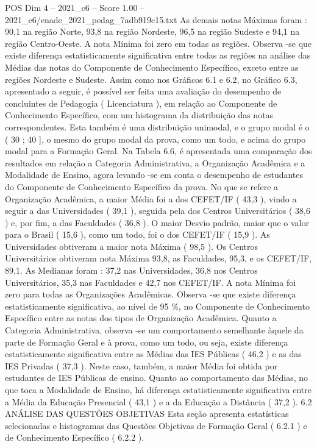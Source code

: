 \begin{textsample}{POS Dim 4 – 2021\_c6 – Score 1.00 – 2021\_c6/enade\_2021\_pedag\_7adb919c15.txt}
As demais notas Máximas foram : 90,1 na região Norte, 93,8 na região Nordeste, 96,5 na região Sudeste e 94,1 na região Centro-Oeste.
A nota Mínima foi zero em todas as regiões.
Observa -se que existe diferença estatisticamente significativa entre todas as regiões na análise das Médias das notas do Componente de Conhecimento Específico, exceto entre as regiões Nordeste e Sudeste.
Assim como nos Gráficos 6.1 e 6.2, no Gráfico 6.3, apresentado a seguir, é possível ser feita uma avaliação do desempenho de concluintes de Pedagogia ( Licenciatura ), em relação ao Componente de Conhecimento Específico, com um histograma da distribuição das notas correspondentes.
Esta também é uma distribuição unimodal, e o grupo modal é o ( 30 ; 40 ], o mesmo do grupo modal da prova, como um todo, e acima do grupo modal para a Formação Geral.
Na Tabela 6.6, é apresentada uma comparação dos resultados em relação a Categoria Administrativa, a Organização Acadêmica e a Modalidade de Ensino, agora levando -se em conta o desempenho de estudantes do Componente de Conhecimento Específico da prova.
No que se refere a Organização Acadêmica, a maior Média foi a dos CEFET/IF ( 43,3 ), vindo a seguir a das Universidades ( 39,1 ), seguida pela dos Centros Universitários ( 38,6 ) e, por fim, a das Faculdades ( 36,8 ).
O maior Desvio padrão, maior que o valor para o Brasil ( 15,6 ), como um todo, foi o dos CEFET/IF ( 15,9 ).
As Universidades obtiveram a maior nota Máxima ( 98,5 ).
Os Centros Universitários obtiveram nota Máxima 93,8, as Faculdades, 95,3, e os CEFET/IF, 89,1.
As Medianas foram : 37,2 nas Universidades, 36,8 nos Centros Universitários, 35,3 nas Faculdades e 42,7 nos CEFET/IF.
A nota Mínima foi zero para todas as Organizações Acadêmicas.
Observa -se que existe diferença estatisticamente significativa, ao nível de 95 \%, no Componente de Conhecimento Específico entre as notas dos tipos de Organização Acadêmica.
Quanto a Categoria Administrativa, observa -se um comportamento semelhante àquele da parte de Formação Geral e à prova, como um todo, ou seja, existe diferença estatisticamente significativa entre as Médias das IES Públicas ( 46,2 ) e as das IES Privadas ( 37,3 ).
Neste caso, também, a maior Média foi obtida por estudantes de IES Públicas de ensino.
Quanto ao comportamento das Médias, no que toca a Modalidade de Ensino, há diferença estatisticamente significativa entre a Média da Educação Presencial ( 43,1 ) e a da Educação a Distância ( 37,2 ). 6.2 ANÁLISE DAS QUESTÕES OBJETIVAS Esta seção apresenta estatísticas selecionadas e histogramas das Questões Objetivas de Formação Geral ( 6.2.1 ) e de Conhecimento Específico ( 6.2.2 ).

\end{textsample}

